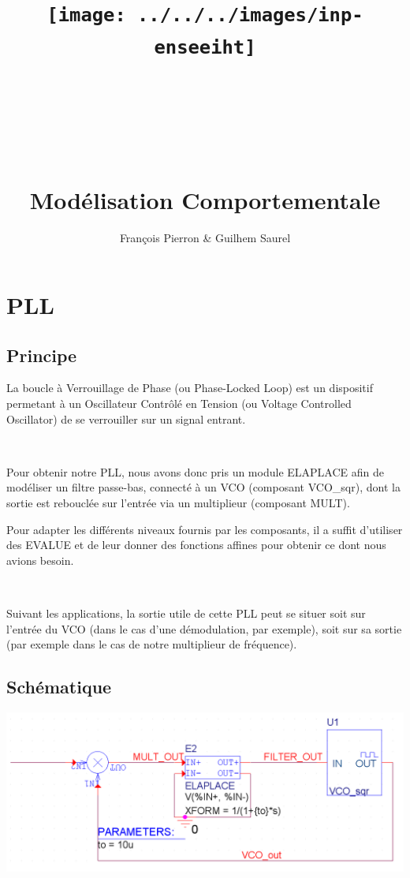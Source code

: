 \documentclass{article}
\title{\texttt{[image: ../../../images/inp-enseeiht]} \\ ~ \\ ~ \\ ~ \\ ~ \\ Modélisation Comportementale}
\author{François Pierron \& Guilhem Saurel}
\date{\oldstylenums{\today}}
\begin{document}
\begin{titlepage}
    \setcounter{page}{0}
    \maketitle
    \vfill
    \tableofcontents
    \thispagestyle{empty}
\end{titlepage}

\section{PLL}

\subsection{Principe}
La boucle à Verrouillage de Phase (ou Phase-Locked Loop) est un dispositif permetant à un Oscillateur Contrôlé en Tension (ou Voltage Controlled Oscillator) de se verrouiller sur un signal entrant.

~

Pour obtenir notre PLL, nous avons donc pris un module ELAPLACE afin de modéliser un filtre passe-bas, connecté à un VCO (composant VCO\_sqr), dont la sortie est rebouclée sur l’entrée via un multiplieur (composant MULT).

Pour adapter les différents niveaux fournis par les composants, il a suffit d’utiliser des EVALUE et de leur donner des fonctions affines pour obtenir ce dont nous avions besoin.

~

Suivant les applications, la sortie utile de cette PLL peut se situer soit sur l’entrée du VCO (dans le cas d’une démodulation, par exemple), soit sur sa sortie (par exemple dans le cas de notre multiplieur de fréquence).

\subsection{Schématique}

\includegraphics[width=\linewidth]{pll_sch.png}
\end{document}
